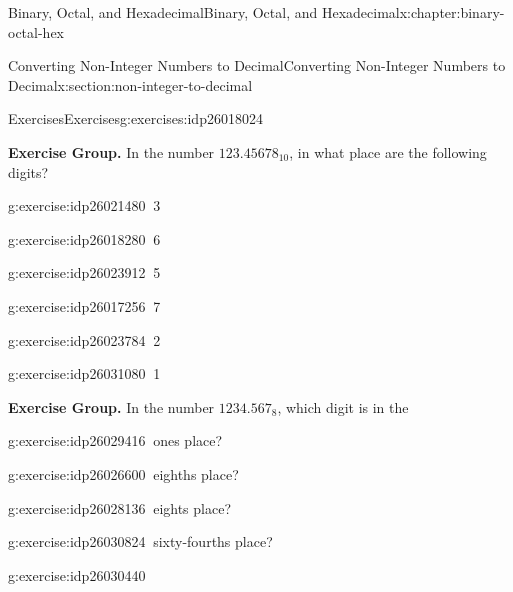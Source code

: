 \documentclass[twoside,10pt,]{book}
\numberwithin{equation}{section}
\begin{document}
\begin{chapterptx}{Binary, Octal, and Hexadecimal}{}{Binary, Octal, and Hexadecimal}{}{}{x:chapter:binary-octal-hex}
\begin{sectionptx}{Converting Non-Integer Numbers to Decimal}{}{Converting Non-Integer Numbers to Decimal}{}{}{x:section:non-integer-to-decimal}
\typeout{************************************************}
%
\begin{exercises-subsection}{Exercises}{}{Exercises}{}{}{g:exercises:idp26018024}
\par\medskip\noindent%
\textbf{Exercise Group.}\space\space%
In the number \(123.45678_{10}\), in what place are the following digits?\begin{exercisegroup}
\begin{divisionexerciseeg}{1}{}{}{g:exercise:idp26021480}%
\(\ \)3\end{divisionexerciseeg}%
\begin{divisionexerciseeg}{2}{}{}{g:exercise:idp26018280}%
\(\ \)6\end{divisionexerciseeg}%
\begin{divisionexerciseeg}{3}{}{}{g:exercise:idp26023912}%
\(\ \)5\end{divisionexerciseeg}%
\begin{divisionexerciseeg}{4}{}{}{g:exercise:idp26017256}%
\(\ \)7\end{divisionexerciseeg}%
\begin{divisionexerciseeg}{5}{}{}{g:exercise:idp26023784}%
\(\ \)2\end{divisionexerciseeg}%
\begin{divisionexerciseeg}{6}{}{}{g:exercise:idp26031080}%
\(\ \)1\end{divisionexerciseeg}%
\end{exercisegroup}
\par\medskip\noindent
\par\medskip\noindent%
\textbf{Exercise Group.}\space\space%
In the number \(1234.567_8\), which digit is in the\begin{exercisegroup}
\begin{divisionexerciseeg}{7}{}{}{g:exercise:idp26029416}%
\(\ \)ones place?\end{divisionexerciseeg}%
\begin{divisionexerciseeg}{8}{}{}{g:exercise:idp26026600}%
\(\ \)eighths place?\end{divisionexerciseeg}%
\begin{divisionexerciseeg}{9}{}{}{g:exercise:idp26028136}%
\(\ \)eights place?\end{divisionexerciseeg}%
\begin{divisionexerciseeg}{10}{}{}{g:exercise:idp26030824}%
\(\ \)sixty-fourths place?\end{divisionexerciseeg}%
\begin{divisionexerciseeg}{11}{}{}{g:exercise:idp26030440}%

\end{divisionexerciseeg}
\end{exercisegroup}
\end{exercises-subsection}
\end{sectionptx}
\end{chapterptx}
\end{document}
